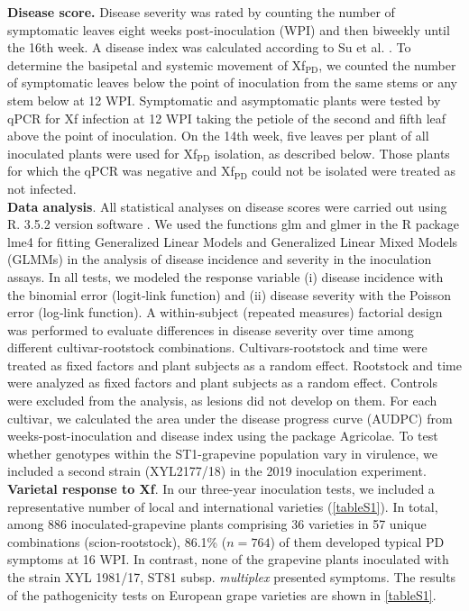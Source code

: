\noindent\textbf{Disease score.} Disease severity was rated by counting the
number of symptomatic leaves eight weeks post-inoculation (WPI) and then
biweekly until the 16th week. A disease index was calculated according to Su et
al. \cite{Su2013}. To determine the basipetal and systemic movement of
Xf$_{\textrm{PD}}$, we counted the number of symptomatic leaves below the point
of inoculation from the same stems or any stem below at 12 WPI. Symptomatic and
asymptomatic plants were tested by qPCR for Xf infection at 12 WPI taking the
petiole of the second and fifth leaf above the point of inoculation. On the
14th week, five leaves per plant of all inoculated plants were used for
Xf$_{\textrm{PD}}$ isolation, as described below. Those plants for which the
qPCR was negative and Xf$_{\textrm{PD}}$ could not be isolated were treated as
not infected.\\

\noindent\textbf{Data analysis}. All statistical analyses on disease scores
were carried out using R. 3.5.2 version software
\cite{R-Development-Core-Team2017}. We used the functions glm and glmer in the
R package lme4 \cite{Bates2015}  for fitting Generalized Linear Models and
Generalized Linear Mixed Models (GLMMs) in the analysis of disease incidence
and severity in the inoculation assays. In all tests, we modeled the response
variable (i) disease incidence with the binomial error (logit‐link function)
and (ii) disease severity with the Poisson error (log‐link function). A
within-subject (repeated measures) factorial design was performed to evaluate
differences in disease severity over time among different cultivar-rootstock
combinations. Cultivars-rootstock and time were treated as fixed factors and
plant subjects as a random effect. Rootstock and time were analyzed as fixed
factors and plant subjects as a random effect. Controls were excluded from the
analysis, as lesions did not develop on them. For each cultivar, we calculated
the area under the disease progress curve (AUDPC) from weeks-post-inoculation
and disease index using the package Agricolae. To test whether genotypes within
the ST1-grapevine population vary in virulence, we included a second strain
(XYL2177/18) in the 2019 inoculation experiment.\\

\noindent\textbf{Varietal response to Xf}. In our three-year inoculation tests,
we included a representative number of local and international varieties
(\cref{tableS1}). In total, among 886 inoculated-grapevine plants comprising 36
varieties in 57 unique combinations (scion-rootstock), 86.1\% ($n = 764$) of
them developed typical PD symptoms at 16 WPI. In contrast, none of the
grapevine plants inoculated with the strain XYL 1981/17, ST81 subsp.
\textit{multiplex} presented symptoms. The results of the pathogenicity tests
on European grape varieties are shown in \cref{tableS1}.

